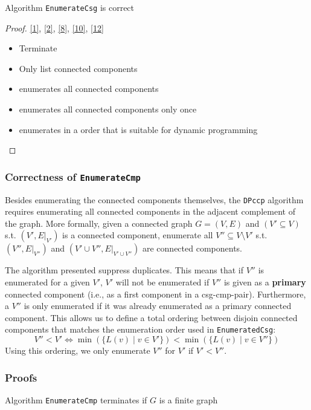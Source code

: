 \documentclass[11pt]{article}
\begin{document}
\begin{theorem}[]
Algorithm \texttt{EnumerateCsg} is correct
\end{theorem}

\begin{proof}
\ref{1}, \ref{2}, \ref{8}, \ref{10}, \ref{12}
\begin{itemize}
\item Terminate
\item Only list connected components
\item enumerates all connected components
\item enumerates all connected components only once
\item enumerates in a order that is suitable for dynamic programming
\end{itemize}
\end{proof}
\subsubsection{Correctness of \texttt{EnumerateCmp}}
\label{sec:org73d7281}
Besides enumerating the connected components themselves, the \texttt{DPccp} algorithm requires enumerating all
connected components in the adjacent complement of the graph. More formally, given a connected graph
\(G=(V,E)\) and \((V'\subseteq V)\) s.t. \((V',E|_{V'})\) is a connected component, enumerate all
\(V''\subseteq V\setminus V'\) s.t. \((V'',E|_{V''})\) and \((V'\cup V'',E|_{V'\cup V''})\) are
connected components.

The algorithm presented suppress duplicates. This means that if \(V''\) is enumerated for a given
\(V'\), \(V'\) will not be enumerated if \(V''\) is given as a \textbf{primary} connected component (i.e., as a
first component in a csg-cmp-pair). Furthermore, a \(V''\) is only enumerated if it was already
enumerated as a primary connected component. This allows us to define a total ordering between disjoin
connected components that matches the enumeration order used in \texttt{EnumeratedCsg}:
\begin{equation*}
V''<V'\Leftrightarrow\min(\{L(v)\mid v\in V'\})<\min(\{L(v)\mid v\in V''\})
\end{equation*}
Using this ordering, we only enumerate \(V''\) for \(V'\) if \(V'<V''\).
\subsubsection{Proofs}
\label{sec:orgfe76cbc}
\begin{lemma}[]
Algorithm \texttt{EnumerateCmp} terminates if \(G\) is a finite graph
\end{lemma}
\end{document}
